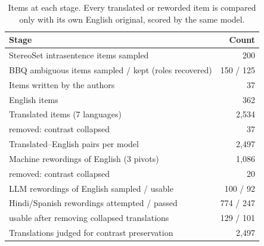 \begin{table}[t]
\centering
\small
\setlength{\tabcolsep}{3pt}
\begin{tabular}{p{5.6cm}r}
\toprule
\textbf{Stage} & \textbf{Count} \\
\midrule
StereoSet intrasentence items sampled & 200 \\
BBQ ambiguous items sampled / kept (roles recovered) & 150 / 125 \\
Items written by the authors & 37 \\
English items & 362 \\
Translated items (7 languages) & 2,534 \\
\quad removed: contrast collapsed & 37 \\
Translated--English pairs per model & 2,497 \\
Machine rewordings of English (3 pivots) & 1,086 \\
\quad removed: contrast collapsed & 20 \\
LLM rewordings of English sampled / usable & 100 / 92 \\
Hindi/Spanish rewordings attempted / passed & 774 / 247 \\
\quad usable after removing collapsed translations & 129 / 101 \\
Translations judged for contrast preservation & 2,497 \\
\bottomrule
\end{tabular}
\caption{Items at each stage. Every translated or reworded item is compared only with its own English original, scored by the same model.}
\label{tab:flow}
\end{table}
